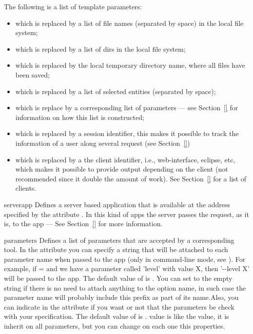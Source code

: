 {  \bigskip 
  \noindent
  The following is a list of template parameters:

  \begin{itemize}
  \item {} which is replaced by a list of
    file names (separated by space) in the local file system;
\item {} which is replaced by a list of
  dirs in the local file system;
\item {} which is replaced by the local
  temporary directory name, where all files have been saved;
  \item {} which is replaced by a list of
    selected entities (separated by space);
  \item {} which is replace by a
    corresponding list of parameters --- see Section~\ref{} for
    information on how this list is constructed;
  \item {} which is replaced by a
    session identifier, this makes it possible to track the information
    of a user along several request (see Section~\ref{})
  \item {} which is replaced by a the
    client identifier, i.e., web-interface, eclipse, etc, which makes
    it possible to provide output depending on the client (not
    recommended since it double the amount of work). See
    Section~\ref{} for a list of clients.
  \end{itemize}
}
{}

\bigskip
\xmlstruct
{serverapp}
{
%
  Defines a server based application that is available at the address
  specified by the attribute . In this kind of apps
  the \apps server passes the request, as it is, to the app --- See
  Section~\ref{} for more information.
%
}
{}

\bigskip 
\xmlstruct
{parameters} 
{
%
  Defines a list of parameters that are accepted by a corresponding
  tool. In the  attribute you can specify a
  string that will be attached to each parameter name when passed to
  the app (only in command-line mode, see
  ).
  For example, if = and
  we have a parameter called 'level' with value X, then '{-}{-}level
  X' will be passed to the app. The default value of
   is . You can set
   to the empty string  if
  there is no need to attach anything to the option name, in such case
  the parameter name will probably include this prefix as part of its
  name.Also, you can indicate in the  attribute
  if you want or not that the parameters be check with your
  specification. The default value of  is
  .  value is like the
   value, it is inherit on all parameters, but
  you can change on each one this properties.
%
}
{}

